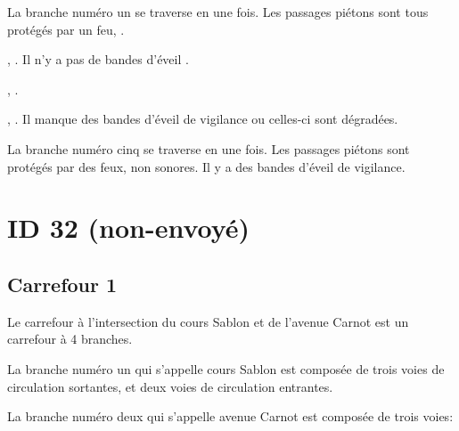 \begin{appendix}
La branche numéro un se traverse en une fois. Les passages piétons sont tous protégés par un feu, .  

\newpar{}

, . Il n'y a pas de bandes d'éveil . 

\newpar{}

,  . 

\newpar{}

, . Il manque des bandes d'éveil de vigilance ou celles-ci sont dégradées.

\newpar{}

La branche numéro cinq se traverse en une fois. Les passages piétons sont protégés par des feux, non sonores.  Il y a des bandes d'éveil de vigilance.

\section*{ID 32 (non-envoyé)}

\label{annexe:q_ID32}

\subsection*{Carrefour 1}

\label{annexe:q_ID32_carrefour1}

Le carrefour à l'intersection du cours Sablon et de l'avenue Carnot est un carrefour à 4 branches.

\newpar{}

La branche numéro un qui s'appelle cours Sablon est composée de trois voies de circulation sortantes, et deux voies de circulation entrantes.

\newpar{}

La branche numéro deux qui s'appelle avenue Carnot est composée  de trois voies: 


\end{appendix}
